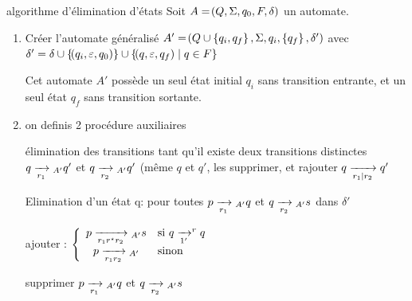 \documentclass[a4paper,french,bookmarks]{book}
\begin{document}
    \begin{definition}{algorithme d'élimination d'états}{}
        Soit $A = \!\left(Q, \Sigma, q_0, F, \delta\right)$ un automate.
        \begin{enumerate}
            \item Créer l'automate généralisé $A' = \!\left(Q \cup \left\{q_i, q_f\right\}, \Sigma, q_i, \left\{q_f\right\}, \delta'\right)$ avec $\delta' = \delta \cup\left\{\!\left(q_i, \varepsilon, q_0\right)\right\} \cup \left\{\!\left(q, \varepsilon, q_f\right) \;\middle\vert\; q \in F\right\}$
            
            Cet automate $A'$ possède un seul état initial $q_i$ sans transition entrante, et un seul état $q_f$ sans transition sortante.
        
            \item on definis 2 procédure auxiliaires
            \begin{enumerate}
                \itt  élimination des transitions tant qu'il existe deux transitions distinctes $q \lima{r_1}{}_{A'} q'$ et $q \lima{r_2}{}_{A'} q'$ (même $q$ et $q'$, les supprimer, et rajouter $q \lima{r_1 \vert r_2}{} q'$
            
                \itt Elimination d'un état q: pour toutes $p \lima{r_1}{}_{A'} q$ et $q \lima{r_2}{}_{A'} s$ dans $\delta'$
                    \begin{enumerate}
                        \itt ajouter : $\left\lbrace\begin{array}{cl}
                            p \lima{r_1 r^\star r_2}{}_{A'} s &\text{si} \ q \lima{1'}^r q\\ %
                            p \lima{r_1 r_2}{}_{A'} & \text{sinon}
                        \end{array}\right.$ 
                        
                        
                        
                
                        \itt supprimer $p \lima{r_1}{}_{A'} q$ et $q \lima{r_2}{}_{A'} s$
                        

\end{enumerate}
\end{enumerate}
\end{enumerate}
\end{definition}
\end{document}
